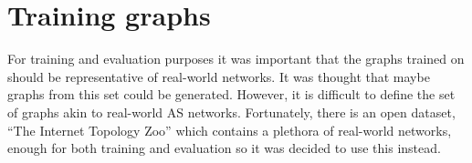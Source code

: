 \section{Training graphs}
For training and evaluation purposes it was important that the graphs trained on should be representative of real-world networks. It was thought that maybe graphs from this set could be generated. However, it is difficult to define the set of graphs akin to real-world AS networks. Fortunately, there is an open dataset, ``The Internet Topology Zoo''\cite{6027859} which contains a plethora of real-world networks, enough for both training and evaluation so it was decided to use this instead.
